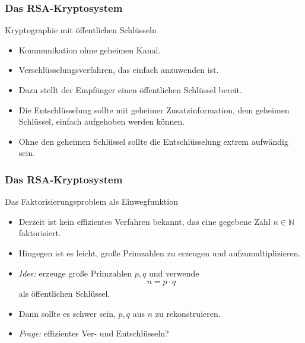 \documentclass{beamer}
\title[Linadi]{\mytitle}
\author[Amin Coja-Oghlan]{Amin Coja-Oghlan}
\institute[Frankfurt]{JWGUFFM}
\date{}
\renewcommand{\emph}[1]{{\textcolor{solarizedRed}{\itshape #1}}}
\newcommand\NN{\mathbb N}
\renewcommand{\ae}{\"a}
\renewcommand{\oe}{\"o}
\newcommand{\ue}{\"u}
\newcommand{\mytitle}{Das RSA-Kryptosystem}
\begin{document}
\frame[plain]{\titlepage}

\begin{frame}\frametitle{\mytitle}
	\begin{block}{Kryptographie mit \oe ffentlichen Schl\ue sseln}
		\begin{itemize}
			\item Kommunikation ohne geheimen Kanal.
			\item Verschl\ue sselungsverfahren, das einfach anzuwenden ist.
			\item Dazu stellt der Empf\ae nger einen \alert{\oe ffentlichen Schl\ue ssel} bereit.
			\item Die Entschl\ue sselung sollte mit geheimer Zusatzinformation, dem \alert{geheimen Schl\ue ssel}, einfach aufgehoben werden k\oe nnen.
			\item Ohne den geheimen Schl\ue ssel sollte die Entschl\ue sselung extrem aufw\ae ndig sein.
		\end{itemize}
	\end{block}
\end{frame}

\begin{frame}\frametitle{\mytitle}
	\begin{block}{Das Faktorisierungsproblem als Einwegfunktion}
		\begin{itemize}
			\item Derzeit ist kein effizientes Verfahren bekannt, das eine gegebene Zahl $n\in\NN$ faktorisiert.
			\item Hingegen ist es leicht, gro\ss e Primzahlen zu erzeugen und aufzumultiplizieren.
			\item \emph{Idee:} erzeuge gro\ss e Primzahlen $p,q$ und verwende
				\begin{align*}
					n=p\cdot q
				\end{align*}
				als \oe ffentlichen Schl\ue ssel.
			\item Dann sollte es schwer sein, $p,q$ aus $n$ zu rekonstruieren.
			\item \emph{Frage:} effizientes Ver- und Entschl\ue sseln?
		\end{itemize}
	\end{block}
\end{frame}
\end{document}
